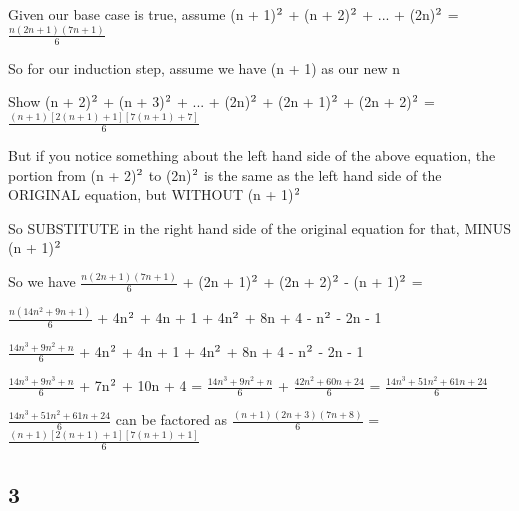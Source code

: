 \documentclass{article}
\begin{document}
\noindent Given our base case is true, assume (n + 1)$\textsuperscript{2}$ + (n + 2)$\textsuperscript{2}$ + ... + (2n)$\textsuperscript{2}$ = $\frac{n(2n + 1)(7n + 1)}{6}$ \vspace{0.5cm}

\noindent So for our induction step, assume we have (n + 1) as our new n \vspace{0.5cm}

\noindent Show (n + 2)$\textsuperscript{2}$ + (n + 3)$\textsuperscript{2}$ + ... + (2n)$\textsuperscript{2}$ + (2n + 1)$\textsuperscript{2}$ + (2n + 2)$\textsuperscript{2}$ = $\frac{(n + 1)[2(n + 1) + 1][7(n + 1) + 7]}{6}$ \vspace{0.5cm}

\noindent But if you notice something about the left hand side of the above equation, the portion from (n + 2)$\textsuperscript{2}$ to (2n)$\textsuperscript{2}$ is the same as the left hand side of the ORIGINAL equation, but WITHOUT (n + 1)$\textsuperscript{2}$ \vspace{0.5cm}

\noindent So SUBSTITUTE in the right hand side of the original equation for that, MINUS (n + 1)$\textsuperscript{2}$ \vspace{0.5cm}

\noindent So we have $\frac{n(2n + 1)(7n + 1)}{6}$ + (2n + 1)$\textsuperscript{2}$ + (2n + 2)$\textsuperscript{2}$ - (n + 1)$\textsuperscript{2}$ = \vspace{0.5cm}

\noindent $\frac{n(14n^2 + 9n + 1)}{6}$ + 4n$\textsuperscript{2}$ + 4n + 1 + 4n$\textsuperscript{2}$ + 8n + 4 - n$\textsuperscript{2}$ - 2n - 1 \vspace{0.5cm}

\noindent $\frac{14n^3 + 9n^2 + n}{6}$ + 4n$\textsuperscript{2}$ + 4n + 1 + 4n$\textsuperscript{2}$ + 8n + 4 - n$\textsuperscript{2}$ - 2n - 1 \vspace{0.5cm}

\noindent $\frac{14n^3 + 9n^3 + n}{6}$ + 7n$\textsuperscript{2}$ + 10n + 4 = $\frac{14n^3 + 9n^2 + n}{6}$ + $\frac{42n^2 + 60n + 24}{6}$ = $\frac{14n^3 + 51n^2 + 61n + 24}{6}$ \vspace{0.5cm}

\noindent $\frac{14n^3 + 51n^2 + 61n + 24}{6}$ can be factored as $\frac{(n + 1)(2n + 3)(7n + 8)}{6}$  = $\frac{(n + 1)[2(n + 1) + 1][7(n + 1) + 1]}{6}$\vspace{0.5cm}


\subsection{3}
\end{document}
